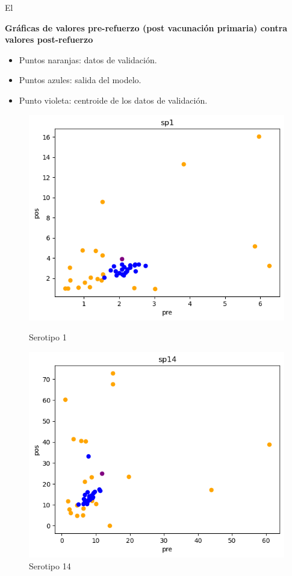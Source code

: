 El 

\textbf{Gráficas de valores pre-refuerzo (post vacunación primaria) contra valores post-refuerzo}
\begin{itemize}
    \item Puntos naranjas: datos de validación.
    \item Puntos azules: salida del modelo.
    \item Punto violeta: centroide de los datos de validación.
\end{itemize}
\begin{figure}[h]
    \centering
    \begin{minipage}{0.45\textwidth}
        \centering
        \includegraphics[width=\linewidth]{Graphics/sp1t.png}
        \caption{Serotipo 1}
        \label{fig:sp1t}
    \end{minipage}%
    \hfill
    \begin{minipage}{0.45\textwidth}
        \centering
        \includegraphics[width=\linewidth]{Graphics/sp14t.png}
        \caption{Serotipo 14}
        \label{fig:sp14t}
    \end{minipage}
\end{figure}

